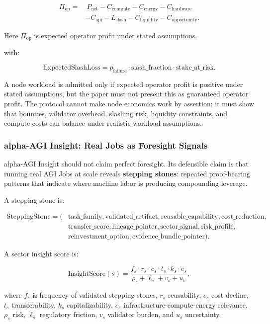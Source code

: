 \[
\begin{aligned}
\Pi_{\mathrm{op}}=&\ P_{\mathrm{net}}
-C_{\mathrm{compute}}
-C_{\mathrm{energy}}
-C_{\mathrm{hardware}}\\
&-C_{\mathrm{api}}
-L_{\mathrm{slash}}
-C_{\mathrm{liquidity}}
-C_{\mathrm{opportunity}}.
\end{aligned}
\]

Here \(\Pi_{\mathrm{op}}\) is expected operator profit under stated
assumptions.

with:

\[
\mathrm{ExpectedSlashLoss}
=
p_{\mathrm{failure}}\cdot
\mathrm{slash\_fraction}\cdot
\mathrm{stake\_at\_risk}.
\]

A node workload is admitted only if expected operator profit is positive
under stated assumptions, but the paper must not present this as
guaranteed operator profit. The protocol cannot make node economics work
by assertion; it must show that bounties, validator overhead, slashing
risk, liquidity constraints, and compute costs can balance under
realistic workload assumptions.

\subsubsection{alpha-AGI Insight: Real Jobs as Foresight
Signals}\label{alpha-agi-insight-real-jobs-as-foresight-signals}

alpha-AGI Insight should not claim perfect foresight. Its defensible
claim is that running real AGI Jobs at scale reveals \textbf{stepping
stones}: repeated proof-bearing patterns that indicate where machine
labor is producing compounding leverage.

A stepping stone is:

\[
\begin{aligned}
\mathrm{SteppingStone}=(&\mathrm{task\_family}, \mathrm{validated\_artifact},
\mathrm{reusable\_capability}, \mathrm{cost\_reduction},\\
&\mathrm{transfer\_score}, \mathrm{lineage\_pointer},
\mathrm{sector\_signal}, \mathrm{risk\_profile},\\
&\mathrm{reinvestment\_option}, \mathrm{evidence\_bundle\_pointer}).
\end{aligned}
\]

A sector insight score is:

\[
\mathrm{InsightScore}(s)
=
\frac{
f_s\cdot r_s\cdot c_s\cdot t_s\cdot k_s\cdot e_s
}{
\rho_s+\ell_s+v_s+u_s
},
\]

where \(f_s\) is frequency of validated stepping stones, \(r_s\)
reusability, \(c_s\) cost decline, \(t_s\) transferability, \(k_s\)
capitalizability, \(e_s\) infrastructure-compute-energy relevance,
\(\rho_s\) risk, \(\ell_s\) regulatory friction, \(v_s\) validator
burden, and \(u_s\) uncertainty.

